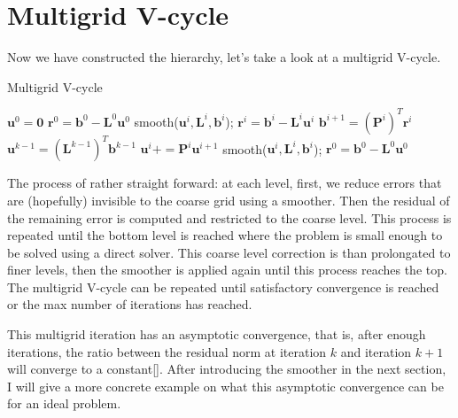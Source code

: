 \section{Multigrid V-cycle}
Now we have constructed the hierarchy, let's take a look at a multigrid V-cycle.
\begin{algorithm}[H]
\caption{Multigrid V-cycle}
\label{alg:vcycle}
\begin{algorithmic}
\STATE $\mathbf{u}^0 = \mathbf{0}$
\STATE $\mathbf{r}^0 = \mathbf{b}^0 - \mathbf{L}^0\mathbf{u}^0$
		\STATE smooth($\mathbf{u}^i,\mathbf{L}^i,\mathbf{b}^i$);
		\STATE $\mathbf{r}^i = \mathbf{b}^i - \mathbf{L}^i\mathbf{u}^i$
		\STATE $\mathbf{b}^{i+1} = (\mathbf{P}^i)^T\mathbf{r}^i $
	\ENDFOR
	\STATE $\mathbf{u}^{k-1} = (\mathbf{L}^{k-1})^T \mathbf{b}^{k-1}$	
		\STATE $\mathbf{u}^{i} += \mathbf{P}^i\mathbf{u}^{i+1} $
		\STATE smooth($\mathbf{u}^i,\mathbf{L}^i,\mathbf{b}^i$);		
	\ENDFOR
	\STATE $\mathbf{r}^0 = \mathbf{b}^0 - \mathbf{L}^0\mathbf{u}^0$
\ENDWHILE
\end{algorithmic}
\end{algorithm}
The process of rather straight forward: at each level, first, we reduce errors that are (hopefully) invisible to the coarse grid using a smoother. Then the residual of the remaining error is computed and restricted to the coarse level. This process is repeated until  the bottom level is reached where the problem is small enough to be solved using a direct solver. This coarse level correction is than prolongated to finer levels, then the smoother is applied again until this process reaches the top. The multigrid V-cycle can be repeated until satisfactory convergence is reached or the max number of iterations has reached.

This multigrid iteration has an asymptotic convergence, that is, after enough iterations, the ratio between the residual norm at iteration $k$ and iteration $k+1$ will converge to a constant[\cite{brandt1977multi}]. After introducing the smoother in the next section, I will give a more concrete example on what this asymptotic convergence can be for an ideal problem.
